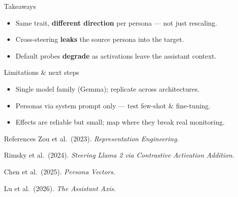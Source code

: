\documentclass{article}
\newcommand{\smallbody}{\fontsize{19}{24}\selectfont\color{ink}}
\newcommand{\captionsize}{\fontsize{16}{20}\selectfont\color{ink}}
\begin{document}
\noindent
\begin{minipage}[t]{0.32\textwidth}
\begin{posterblock}[equal height group=row5]{Takeaways}
\smallbody
\begin{itemize}[leftmargin=5mm, itemsep=4pt, labelsep=2.5mm, topsep=0pt]
    \item[\color{midblue}\textbullet] Same trait, \textbf{different direction} per persona --- not just rescaling.
    \item[\color{midblue}\textbullet] Cross-steering \textbf{leaks} the source persona into the target.
    \item[\color{midblue}\textbullet] Default probes \textbf{degrade} as activations leave the assistant context.
\end{itemize}
\end{posterblock}
\end{minipage}\hfill
\begin{minipage}[t]{0.32\textwidth}
\begin{posterblock}[equal height group=row5]{Limitations \& next steps}
\smallbody
\begin{itemize}[leftmargin=5mm, itemsep=4pt, labelsep=2.5mm, topsep=0pt]
    \item[\color{midblue}\textbullet] Single model family (Gemma); replicate across architectures.
    \item[\color{midblue}\textbullet] Personas via system prompt only --- test few-shot \& fine-tuning.
    \item[\color{midblue}\textbullet] Effects are reliable but small; map where they break real monitoring.
\end{itemize}
\end{posterblock}
\end{minipage}\hfill
\begin{minipage}[t]{0.32\textwidth}
\begin{posterblock}[equal height group=row5]{References}
\captionsize
Zou et al.\ (2023). \emph{Representation Engineering.}\par\smallskip
Rimsky et al.\ (2024). \emph{Steering Llama 2 via Contrastive Activation Addition.}\par\smallskip
Chen et al.\ (2025). \emph{Persona Vectors.}\par\smallskip
Lu et al.\ (2026). \emph{The Assistant Axis.}
\end{posterblock}
\end{minipage}
\end{document}
